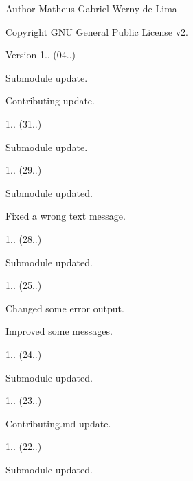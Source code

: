 \begin{DoxyAuthor}{Author}
Matheus Gabriel Werny de Lima 
\end{DoxyAuthor}
\begin{DoxyCopyright}{Copyright}
G\+NU General Public License v2. 
\end{DoxyCopyright}
\begin{DoxyVersion}{Version}
1.. (04..)
\begin{DoxyItemize}
\item Submodule update.
\item Contributing update. 
\end{DoxyItemize}

1.. (31..)
\begin{DoxyItemize}
\item Submodule update. 
\end{DoxyItemize}

1.. (29..)
\begin{DoxyItemize}
\item Submodule updated.
\item Fixed a wrong text message. 
\end{DoxyItemize}

1.. (28..)
\begin{DoxyItemize}
\item Submodule updated. 
\end{DoxyItemize}

1.. (25..)
\begin{DoxyItemize}
\item Changed some error output.
\item Improved some messages. 
\end{DoxyItemize}

1.. (24..)
\begin{DoxyItemize}
\item Submodule updated. 
\end{DoxyItemize}

1.. (23..)
\begin{DoxyItemize}
\item Contributing.\+md update. 
\end{DoxyItemize}

1.. (22..)
\begin{DoxyItemize}
\item Submodule updated. 
\end{DoxyItemize}


\end{DoxyVersion}
